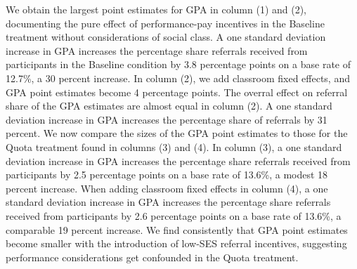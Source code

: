 \documentclass[11pt,a4paper,oneside]{article}
\begin{document}
  We obtain the largest point estimates for GPA in column (1) and (2), documenting the pure effect of performance-pay incentives in the Baseline treatment without considerations of social class. A one standard deviation increase in GPA increases the percentage share referrals received from participants in the Baseline condition by 3.8 percentage points on a base rate of 12.7\%, a 30 percent increase. In column (2), we add classroom fixed effects, and GPA point estimates become 4 percentage points. The overral effect on referral share of the GPA estimates are almost equal in column (2). A one standard deviation increase in GPA increases the percentage share of referrals by 31 percent. We now compare the sizes of the GPA point estimates to those for the Quota treatment found in columns (3) and (4). In column (3), a one standard deviation increase in GPA increases the percentage share referrals received from participants by 2.5 percentage points on a base rate of 13.6\%, a modest 18 percent increase. When adding classroom fixed effects in column (4), a one standard deviation increase in GPA increases the percentage share referrals received from participants by 2.6 percentage points on a base rate of 13.6\%, a comparable 19 percent increase. We find consistently that GPA point estimates become smaller with the introduction of low-SES referral incentives, suggesting performance considerations get confounded in the Quota treatment.
  
\end{document}

